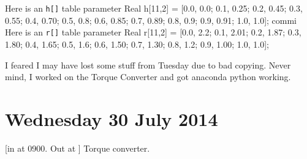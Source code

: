 \documentclass[11pt, oneside]{article}   	%
\begin{document}
Here is an \verb+h[]+ table
parameter Real h[11,2] = [0.0, 0.0; 0.1, 0.25; 0.2, 0.45; 0.3, 0.55; 0.4, 0.70; 0.5, 0.8; 0.6, 0.85; 0.7, 0.89; 0.8, 0.9; 0.9, 0.91; 1.0, 1.0];
commi
Here is an \verb+r[]+ table
parameter Real r[11,2] = [0.0, 2.2; 0.1, 2.01; 0.2, 1.87; 0.3, 1.80; 0.4, 1.65; 0.5, 1.6; 0.6, 1.50; 0.7, 1.30; 0.8, 1.2; 0.9, 1.00; 1.0, 1.0];

I feared I may have lost some stuff from Tuesday due to bad copying.
Never mind, I worked on the Torque Converter and got anaconda python
working.

\section{Wednesday 30 July 2014}
[in at 0900.  Out at ]
Torque converter.
\end{document}
